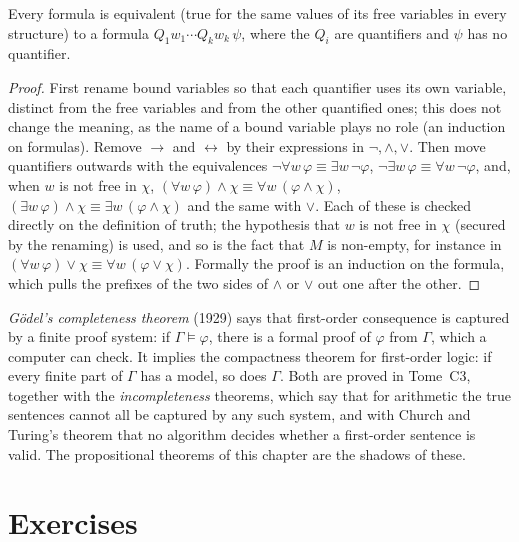\begin{proposition}\label{prop:prenex}
Every formula is equivalent (true for the same values of its free variables in every structure) to a formula
$Q_1w_1\cdots Q_kw_k\,\psi$, where the $Q_i$ are quantifiers and $\psi$ has no quantifier.
\end{proposition}
\begin{proof}
First rename bound variables so that each quantifier uses its own variable, distinct from the free variables and from
the other quantified ones; this does not change the meaning, as the name of a bound variable plays no role (an
induction on formulas). Remove $\to$ and $\leftrightarrow$ by their expressions in $\neg,\land,\lor$. Then move quantifiers outwards with the
equivalences $\neg\forall w\,\varphi\equiv\exists w\,\neg\varphi$, $\neg\exists w\,\varphi\equiv\forall w\,\neg\varphi$, and, when $w$ is not free in $\chi$,
$(\forall w\,\varphi)\land\chi\equiv\forall w\,(\varphi\land\chi)$, $(\exists w\,\varphi)\land\chi\equiv\exists w\,(\varphi\land\chi)$ and the same with $\lor$. Each of these is checked directly on the
definition of truth; the hypothesis that $w$ is not free in $\chi$ (secured by the renaming) is used, and so is the fact that
$M$ is non-empty, for instance in $(\forall w\,\varphi)\lor\chi\equiv\forall w\,(\varphi\lor\chi)$. Formally the proof is an induction on the formula, which
pulls the prefixes of the two sides of $\land$ or $\lor$ out one after the other.
\end{proof}

\begin{remark}
\emph{Gödel's completeness theorem} (1929) says that first-order consequence is captured by a finite proof system: if
$\Gamma\models\varphi$, there is a formal proof of $\varphi$ from $\Gamma$, which a computer can check. It implies the compactness theorem for
first-order logic: if every finite part of $\Gamma$ has a model, so does $\Gamma$. Both are proved in Tome~C3, together with the
\emph{incompleteness} theorems, which say that for arithmetic the true sentences cannot all be captured by any such
system, and with Church and Turing's theorem that no algorithm decides whether a first-order sentence is valid. The
propositional theorems of this chapter are the shadows of these.
\end{remark}

\section{Exercises}

